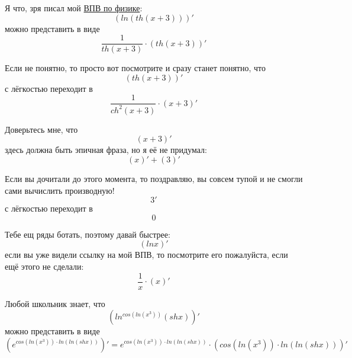 \documentclass[a4paper, 12pt]{article}
\begin{document}
Я что, зря писал мой \href{https://drive.google.com/drive/folders/1cQOob8lLqhboZnilkguOm7CtLHlbPb1G?usp=sharing}{ВПВ по физике}:
\begin{equation}
\left(ln\left(th\left(x + 3\right)\right) \right)'
\end{equation}
можно представить в виде
\begin{equation}
\frac{1}{th\left(x + 3\right)} \cdot \left(th\left(x + 3\right) \right)'
\end{equation}

Если не понятно, то просто вот посмотрите и сразу станет понятно, что
\begin{equation}
\left(th\left(x + 3\right) \right)'
\end{equation}
с лёгкостью переходит в
\begin{equation}
\frac{1}{ch^2\left( x + 3 \right)} \cdot \left( x + 3\right) '
\end{equation}

Доверьтесь мне, что
\begin{equation}
\left(x + 3 \right)'
\end{equation}
здесь должна быть эпичная фраза, но я её не придумал:
\begin{equation}
\left( x \right) ' + \left( 3 \right)'
\end{equation}

Если вы дочитали до этого момента, то поздравляю, вы совсем тупой и не смогли сами вычислить производную!
\begin{equation}
3 '\end{equation}
с лёгкостью переходит в
\[0\]

Тебе ещ ряды ботать, поэтому давай быстрее:
\begin{equation}
\left(lnx \right)'
\end{equation}
если вы уже видели ссылку на мой ВПВ, то посмотрите его пожалуйста, если ещё этого не сделали:
\begin{equation}
\frac{1}{x} \cdot \left(x \right)'
\end{equation}

Любой школьник знает, что
\begin{equation}
\left(ln^{cos\left(ln\left(x^{3}\right)\right)}\left(shx\right) \right)'
\end{equation}
можно представить в виде
\begin{equation}
\left(e^{cos\left(ln\left(x^{3}\right)\right)\cdot ln \left(ln\left(shx\right) \right)}  \right)' = e^{cos\left(ln\left(x^{3}\right)\right)\cdot ln \left(ln\left(shx\right) \right)} \cdot \left( cos\left(ln\left(x^{3}\right)\right)\cdot ln \left(ln\left(shx\right) \right) \right)'
\end{equation}
\end{document}
